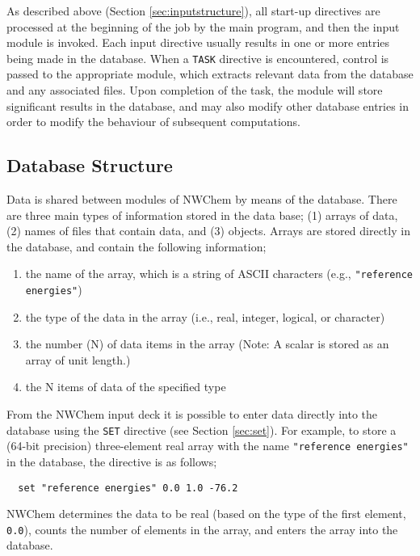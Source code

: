 As described above (Section \ref{sec:inputstructure}), all
start-up directives are processed at the beginning of the job
by the main program, and
then the input module is invoked.  Each input directive usually
results in one or more entries being made in the database.  When a
\verb+TASK+ directive is encountered, control is passed to the
appropriate module, which extracts relevant data from the database and
any associated files.  Upon completion of the task, the module will store
significant results in the database, and may also modify other
database entries in order to modify the behaviour of subsequent
computations.

\subsection{Database Structure}
\label{sec:database}

\sloppy

Data is shared between modules of NWChem by means of the database.  There
are three main types of information stored in the data base; (1) arrays of
data, (2) names of files that contain data, and (3) objects.  
Arrays are stored directly in the database, and contain the following
information;
\begin{enumerate}
\item the name of the array, which is a string of ASCII characters (e.g., 
      \verb+"reference energies"+)
\item the type of the data in the array 
(i.e., real, integer, logical, or character) 
\item the number (N) of data items in the array (Note: A scalar is stored as an array of unit length.)
\item the N items of data of the specified type
\end{enumerate}

\fussy

From the NWChem input deck it is possible to enter data directly into
the database using the \verb+SET+ directive (see Section
\ref{sec:set}).  For example, to store a (64-bit precision)
three-element real array with the name \verb+"reference energies"+ in
the database, the directive is as follows;
\begin{verbatim}
  set "reference energies" 0.0 1.0 -76.2
\end{verbatim}
NWChem determines the data to be real (based on the type of the first
element, \verb+0.0+), counts the number
of elements in the array, and enters the array into the database.

